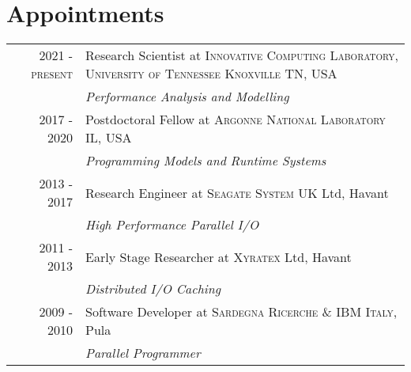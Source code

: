 \documentclass[a4paper,10pt]{article}
\begin{document}
\section{Appointments}
\begin{tabular}{rp{11cm}}
\textsc{2021 - present}& Research Scientist at \textsc{Innovative Computing Laboratory, University of Tennessee Knoxville} TN, USA \\
         & \emph{Performance Analysis and Modelling} \\

\textsc{2017 - 2020}& Postdoctoral Fellow at \textsc{Argonne National Laboratory} IL, USA \\
         & \emph{Programming Models and Runtime Systems}\\

\textsc{2013 - 2017} & Research Engineer at \textsc{Seagate System UK} Ltd, Havant \\
         & \emph{High Performance Parallel I/O}\\

\textsc{2011 - 2013} & Early Stage Researcher at \textsc{Xyratex} Ltd, Havant \\
         & \emph{Distributed I/O Caching}\\

\textsc{2009 - 2010} & Software Developer at \textsc{Sardegna Ricerche \& IBM Italy}, Pula \\
         & \emph{Parallel Programmer}
\end{tabular}

%
\end{document}
